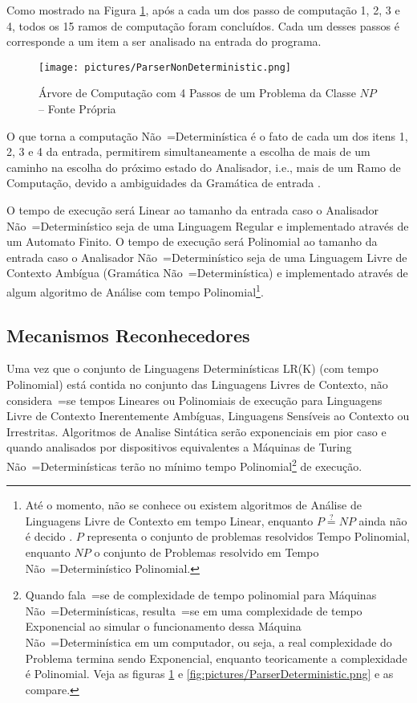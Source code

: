 {    Como mostrado na Figura \ref{fig:pictures/ParserNonDeterministic.png},
    após a cada um dos passo de computação 1,
    2, 3 e 4,
    todos os 15 ramos de computação foram concluídos.
    Cada um desses passos é corresponde a um item a ser analisado na entrada do programa.
    \begin{figure}[h]
    \centering
    \texttt{[image: pictures/ParserNonDeterministic.png]}
    \caption{Árvore de Computação com 4 Passos de um Problema da Classe $NP$ -- Fonte Própria}
    \label{fig:pictures/ParserNonDeterministic.png}
    \end{figure}

    O que torna a computação Não~=Determinística é o fato de cada um dos itens 1,
    2, 3 e 4 da entrada,
    permitirem simultaneamente a escolha de mais de um caminho na escolha do próximo estado do Analisador,
    i.e.,
    mais de um Ramo de Computação,
    devido a ambiguidades da Gramática de entrada \cite{antlrBookTerrentParr}.

    O tempo de execução será Linear ao tamanho da entrada caso o Analisador Não~=Determinístico seja de uma Linguagem Regular e
    implementado através de um Automato Finito.
    O tempo de execução será Polinomial ao tamanho da entrada caso o Analisador Não~=Determinístico seja de uma Linguagem Livre de Contexto Ambígua (Gramática Não~=Determinística) e
    implementado através de algum algoritmo de Análise com tempo Polinomial\footnote{Até o momento,
    não se conhece ou
    existem algoritmos de Análise de Linguagens Livre de Contexto em tempo Linear,
    enquanto $P \stackrel{?}{=} NP$ ainda não é decido \cite{computationalComplexityAuroraBarak}.
    $P$ representa o conjunto de problemas resolvidos Tempo Polinomial,
    enquanto $NP$ o conjunto de Problemas resolvido em Tempo Não~=Determinístico Polinomial.}.


\subsection{Mecanismos Reconhecedores}

    Uma vez que o conjunto de Linguagens Determinísticas LR(K) (com tempo Polinomial) está contida no conjunto das Linguagens Livres de Contexto,
    não considera~=se tempos Lineares ou
    Polinomiais de execução para Linguagens Livre de Contexto Inerentemente Ambíguas,
    Linguagens Sensíveis ao Contexto ou
    Irrestritas.
    Algoritmos de Analise Sintática serão exponenciais em pior caso \cite{contextSensitiveParsing} e
    quando analisados por dispositivos equivalentes a Máquinas de Turing Não~=Determinísticas terão no mínimo tempo Polinomial\footnote{
    Quando fala~=se de complexidade de tempo polinomial para Máquinas Não~=Determinísticas,
    resulta~=se em uma complexidade de tempo Exponencial ao simular o funcionamento dessa Máquina Não~=Determinística em um computador,
    ou seja,
    a real complexidade do Problema termina sendo Exponencial,
    enquanto teoricamente a complexidade é Polinomial.
    Veja as figuras \ref{fig:pictures/ParserNonDeterministic.png} e
    \ref{fig:pictures/ParserDeterministic.png} e
    as compare.
    } de execução.

}
